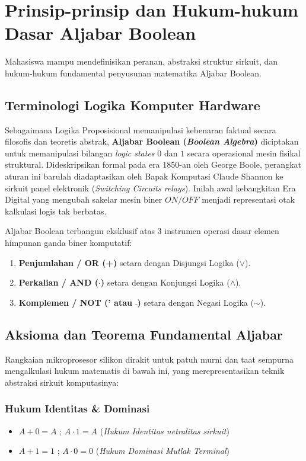 \documentclass[../main.tex]{subfiles}
\begin{document}
\chapter{Prinsip-prinsip dan Hukum-hukum Dasar Aljabar Boolean}

\begin{subcpmk}
  \item Mahasiswa mampu mendefinisikan peranan, abstraksi struktur sirkuit, dan hukum-hukum fundamental penyusunan matematika Aljabar Boolean.
\end{subcpmk}

\section{Terminologi Logika Komputer Hardware}
Sebagaimana Logika Proposisional memanipulasi kebenaran faktual secara filosofis dan teoretis abstrak, \textbf{Aljabar Boolean (\textit{Boolean Algebra})} diciptakan untuk memanipulasi bilangan \textit{logic states} $0$ dan $1$ secara operasional mesin fisikal struktural. Dideskripsikan formal pada era 1850-an oleh George Boole, perangkat aturan ini barulah diadaptasikan oleh Bapak Komputasi Claude Shannon ke sirkuit panel elektronik (\textit{Switching Circuits relays}). Inilah awal kebangkitan Era Digital yang mengubah sakelar mesin biner $ON/OFF$ menjadi representasi otak kalkulasi logis tak berbatas.

Aljabar Boolean terbangun eksklusif atas 3 instrumen operasi dasar elemen himpunan ganda biner komputatif:
\begin{enumerate}
    \item \textbf{Penjumlahan / OR (+)} setara dengan Disjungsi Logika ($\lor$).
    \item \textbf{Perkalian / AND ($\cdot$)} setara dengan Konjungsi Logika ($\land$).
    \item \textbf{Komplemen / NOT (' atau $\bar{}$)} setara dengan Negasi Logika ($\sim$).
\end{enumerate}

\section{Aksioma dan Teorema Fundamental Aljabar}
Rangkaian mikroprosesor silikon dirakit untuk patuh murni dan taat sempurna mengalkulasi hukum matematis di bawah ini, yang merepresentasikan teknik abstraksi sirkuit komputasinya:

\subsection{Hukum Identitas \& Dominasi}
\begin{itemize}
    \item $A + 0 = A$ ; $A \cdot 1 = A$ (\textit{Hukum Identitas netralitas sirkuit})
    \item $A + 1 = 1$ ; $A \cdot 0 = 0$ (\textit{Hukum Dominasi Mutlak Terminal})
\end{itemize}
\end{document}
